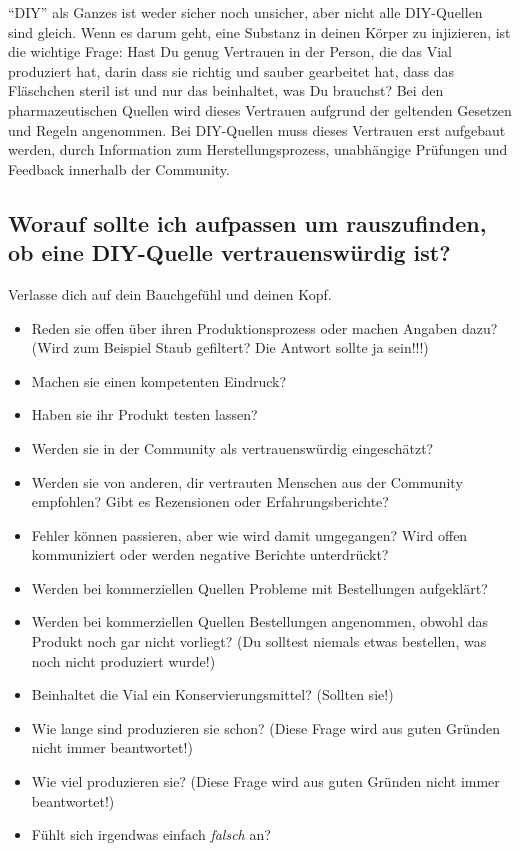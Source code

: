\documentclass{article}
\begin{document}
{“DIY” als Ganzes ist weder sicher noch unsicher, aber nicht alle DIY-Quellen sind gleich. Wenn es darum geht, eine Substanz in deinen Körper zu injizieren, ist die wichtige Frage: Hast Du genug Vertrauen in der Person, die das Vial produziert hat, darin dass sie richtig und sauber gearbeitet hat, dass das Fläschchen steril ist und nur das beinhaltet, was Du brauchst? Bei den pharmazeutischen Quellen wird dieses Vertrauen aufgrund der geltenden Gesetzen und Regeln angenommen. Bei DIY-Quellen muss dieses Vertrauen erst aufgebaut werden, durch Information zum Herstellungsprozess, unabhängige Prüfungen und Feedback innerhalb der Community.

\subsection{Worauf sollte ich aufpassen um rauszufinden, ob eine DIY-Quelle vertrauenswürdig ist?}

Verlasse dich auf dein Bauchgefühl und deinen Kopf. 

\begin{itemize}
  \item Reden sie offen über ihren Produktionsprozess oder machen Angaben dazu? (Wird zum Beispiel Staub gefiltert? Die Antwort sollte ja sein!!!)
  \item Machen sie einen kompetenten Eindruck?
  \item Haben sie ihr Produkt testen lassen? 
  \item Werden sie in der Community als vertrauenswürdig eingeschätzt?
  \item Werden sie von anderen, dir vertrauten Menschen aus der Community empfohlen? Gibt es Rezensionen oder Erfahrungsberichte? 
  \item Fehler können passieren, aber wie wird damit umgegangen? Wird offen kommuniziert oder werden negative Berichte unterdrückt?
  \item Werden bei kommerziellen Quellen Probleme mit Bestellungen aufgeklärt?
  \item Werden bei kommerziellen Quellen Bestellungen angenommen, obwohl das Produkt noch gar nicht vorliegt? (Du solltest niemals etwas bestellen, was noch nicht produziert wurde!)
  \item Beinhaltet die Vial ein Konservierungsmittel? (Sollten sie!)
  \item Wie lange sind produzieren sie schon? (Diese Frage wird aus guten Gründen nicht immer beantwortet!)
  \item Wie viel produzieren sie? (Diese Frage wird aus guten Gründen nicht immer beantwortet!)
  \item Fühlt sich irgendwas einfach \textit{falsch} an?
\end{itemize}

}
\end{document}
